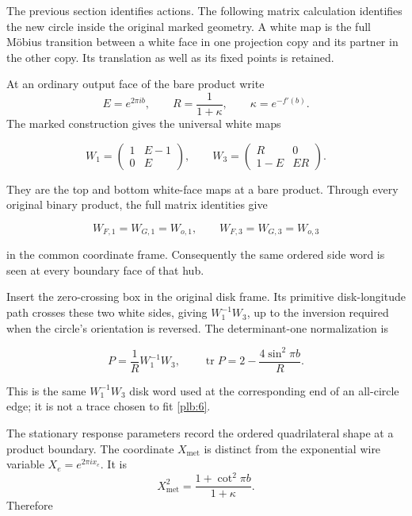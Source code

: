 The previous section identifies actions. The following matrix calculation identifies the new circle inside the
original marked geometry. A white map is the full Möbius transition
between a white face in one projection copy and its partner in the
other copy. Its translation as well as its fixed points is retained.

At an ordinary output face of the bare product write
\[
 E=e^{2\pi ib},\qquad R=\frac1{1+\kappa},\qquad
 \kappa=e^{-f'(b)}.
\]
The marked construction \cite[Section 7]{StrictGeometry}
gives the universal white maps

\begin{equation}\label{plb:15}
W_1=\begin{pmatrix}1&E-1\\0&E\end{pmatrix},\qquad
 W_3=\begin{pmatrix}R&0\\1-E&ER\end{pmatrix}.
\end{equation}

They are the top and bottom white-face maps at a bare product. Through every original binary product, the full matrix identities give

\begin{equation}\label{plb:16}
W_{F,1}=W_{G,1}=W_{o,1},\qquad
 W_{F,3}=W_{G,3}=W_{o,3}
\end{equation}

in the common coordinate frame. Consequently the same ordered side word is seen at every boundary face of that hub.

Insert the zero-crossing box in the original disk frame. Its primitive disk-longitude path crosses these two white sides, giving \(W_1^{-1}W_3\), up to the inversion required when the circle's orientation is reversed. The determinant-one normalization is

\begin{equation}\label{plb:17}
P=\frac1R W_1^{-1}W_3,\qquad
 \operatorname{tr}P
   =2-\frac{4\sin^2\pi b}{R}.
\end{equation}

This is the same \(W_1^{-1}W_3\) disk word used at the corresponding end of an all-circle edge; it is not a trace chosen to fit \eqref{plb:6}.

The stationary response parameters record the ordered quadrilateral
shape at a product boundary. The coordinate \(X_{\mathrm{met}}\) is distinct
from the exponential wire variable \(X_e=e^{2\pi ix_e}\). It is
\[
 X_{\mathrm{met}}^2=\frac{1+\cot^2\pi b}{1+\kappa}.
\]
Therefore

